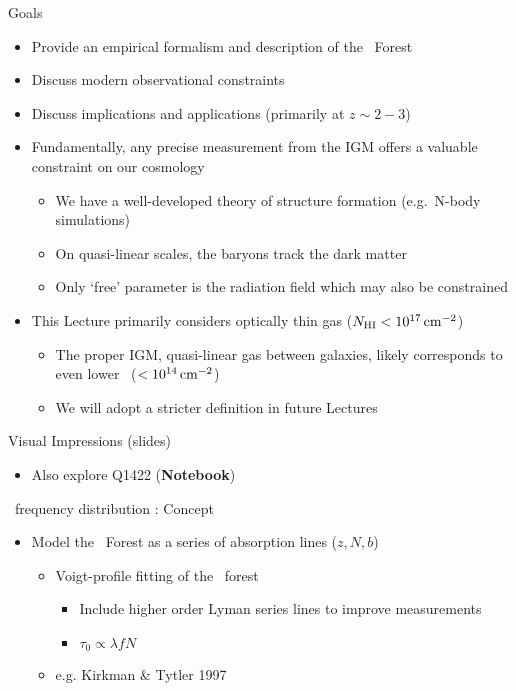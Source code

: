 \documentclass[12pt,letterpaper]{article}
\begin{document}

\begin{Aenumerate}

{\bf \item Goals}
 \begin{itemize}
 \item Provide an empirical formalism and description of the \lya\ Forest
 \item Discuss modern observational constraints
 \item Discuss implications and applications (primarily at $z \sim 2-3$)
 \item Fundamentally, any precise measurement from the IGM offers a 
 valuable constraint on our cosmology
 	\begin{itemize}
 	\item We have a well-developed theory of structure formation (e.g.\ N-body
 	simulations)
 	\item On quasi-linear scales, the baryons track the dark matter
 	\item Only `free' parameter is the radiation field which may also be constrained
 	\end{itemize}
 \item This Lecture primarily considers optically thin gas ($N_{\rm HI}<10^{17} \, {\rm cm^{-2}}$)
 	\begin{itemize}
 	\item The proper IGM, quasi-linear gas between galaxies, likely
 	corresponds to even lower \nhi\ ($<10^{14} \, {\rm cm^{-2}}$)
 	\item We will adopt a stricter definition in future Lectures
 	\end{itemize}
 \end{itemize}

{\bf \item Visual Impressions (slides)}

 \begin{itemize}
  \item Also explore Q1422 ({\bf Notebook})
 \end{itemize}

{\bf \item \nhi\ frequency distribution \fnhi: Concept}

 \begin{itemize}
  \item Model the \lya\ Forest as a series of absorption lines ($z,N,b$)
  	\begin{itemize}
  	\item Voigt-profile fitting of the \lya\ forest
  		\begin{itemize}
  		\item Include higher order Lyman series lines to improve measurements
  		\item $\tau_0 \propto \lambda f N$
	  	\end{itemize}
  	\item e.g. Kirkman \& Tytler 1997


\end{itemize}
\end{itemize}
\end{Aenumerate}
\end{document}
